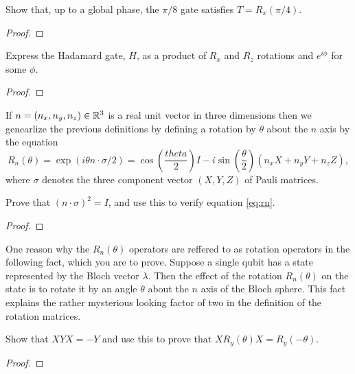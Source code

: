 \documentclass{article}
\begin{document}
\begin{exercise}
  Show that, up to a global phase, the $\pi/8$ gate satisfies $T=R_x(\pi/4)$.
  \begin{proof}

  \end{proof}
\end{exercise}

\begin{exercise}
  Express the Hadamard gate, $H$, as a product of $R_x$ and $R_z$ rotations and $e^{i\phi}$ for some $\phi$.
  \begin{proof}

  \end{proof}
\end{exercise}

If $n=(n_x, n_y, n_z)\in\mathbb{R}^3$ is a real unit vector in three dimensions then we genearlize the previous definitions by defining a rotation by $\theta$ about the $n$ axis by the equation
\begin{equation}
  R_n(\theta) = \exp(i\theta n\cdot\sigma/2)
  =\cos\left(\frac{theta}{2}\right)I
  -i\sin\left(\frac{\theta}{2}\right)(n_xX+n_yY+n_zZ),\label{eq:rn}
\end{equation}
where $\sigma$ denotes the three component vector $(X,Y,Z)$ of Pauli matrices.

\begin{exercise}
  Prove that $(n\cdot\sigma)^2=I$, and use this to verify equation \ref{eq:rn}.
  \begin{proof}

  \end{proof}
\end{exercise}

\begin{exercise}
  One reason why the $R_n(\theta)$ operators are reffered to as rotation operators in the following fact, which you are to prove. Suppose a single qubit has a state represented by the Bloch vector $\lambda$. Then the effect of the rotation $R_n(\theta)$ on the state is to rotate it by an angle $\theta$ about the $n$ axis of the Bloch sphere. This fact explains the rather mysterious looking factor of two in the definition of the rotation matrices.
\end{exercise}

\begin{exercise}
  Show that $XYX=-Y$ and use this to prove that $XR_y(\theta)X=R_y(-\theta)$.
  \begin{proof}

  \end{proof}
\end{exercise}
\end{document}
